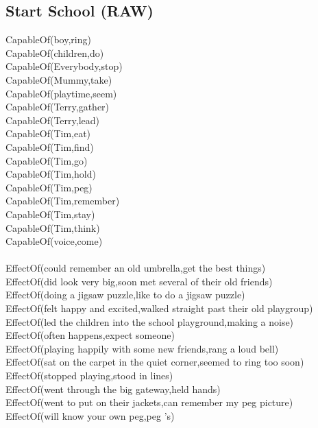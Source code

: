 \subsection{Start School (RAW)}

\begin{multicols}{2}
\begin{footnotesize}
\noindent
CapableOf(boy,ring) \\
CapableOf(children,do) \\
CapableOf(Everybody,stop) \\
CapableOf(Mummy,take) \\
CapableOf(playtime,seem) \\
CapableOf(Terry,gather) \\
CapableOf(Terry,lead) \\
CapableOf(Tim,eat) \\
CapableOf(Tim,find) \\
CapableOf(Tim,go) \\
CapableOf(Tim,hold) \\
CapableOf(Tim,peg) \\
CapableOf(Tim,remember) \\
CapableOf(Tim,stay) \\
CapableOf(Tim,think) \\
CapableOf(voice,come) \\
~\\
EffectOf(could remember an old umbrella,get the best things) \\
EffectOf(did look very big,soon met several of their old friends) \\
EffectOf(doing a jigsaw puzzle,like to do a jigsaw puzzle) \\
EffectOf(felt happy and excited,walked straight past their old playgroup) \\
EffectOf(led the children into the school playground,making a noise) \\
EffectOf(often happens,expect someone) \\
EffectOf(playing happily with some new friends,rang a loud bell) \\
EffectOf(sat on the carpet in the quiet corner,seemed to ring too soon) \\
EffectOf(stopped playing,stood in lines) \\
EffectOf(went through the big gateway,held hands) \\
EffectOf(went to put on their jackets,can remember my peg picture) \\
EffectOf(will know your own peg,peg 's) \\

\end{footnotesize}
\end{multicols}

